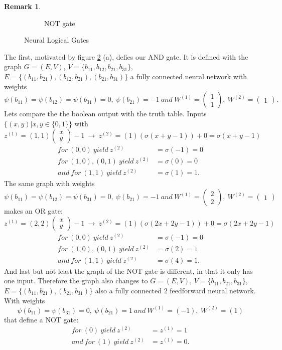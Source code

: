 \documentclass{article}
\theoremstyle{definition}
\newtheorem{remark}[theorem]{Remark}
\begin{document}
\begin{remark}
\begin{figure}[H]
\begin{subfigure}[b]{0.3\textwidth}
        \caption{NOT gate}
        \label{fig:NOT}
    \end{subfigure}
    \caption{Neural Logical Gates}\label{fig:neural_logic_gates}
\end{figure}
The first, motivated by figure \ref{fig:neural_logic_gates} (a), defies our AND gate. It is defined with the graph $G=(E, V)$, $V=\{ b_{11}, b_{12}, b_{21}, b_{31} \}$, $E=\{ (b_{11}, b_{21}), (b_{12}, b_{21}), (b_{21}, b_{31})\}$ a fully connected neural network with weights 
$$\psi(b_{11})=\psi(b_{12})=\psi(b_31)=0, \ \psi(b_{21})=-1 \ and \ W^{(1)}=\begin{pmatrix}1\\1\end{pmatrix}, \ W^{(2)}=\begin{pmatrix}1\end{pmatrix}.$$
Lets compare the the boolean output with the truth table. Inputs $\{(x, y)|x, y \in \{0, 1\}\}$ with
$$z^{(1)}=(1, 1)\begin{pmatrix}x\\y\end{pmatrix}-1 \ \to \ z^{(2)} = (1)(\sigma(x+y-1))+0 = \sigma(x+y-1)$$
\begin{align*}
for \ (0, 0) \ yield \ z^{(2)}&=\sigma(-1)=0 \\
for \ (1, 0), (0, 1) \ yield \ z^{(2)}&=\sigma(0)=0 \\
and \ for \ (1, 1) \ yield \ z^{(2)}&=\sigma(1)=1.
\end{align*}
The same graph with weights
$$\psi(b_{11})=\psi(b_{12})=\psi(b_31)=0, \ \psi(b_{21})=-1 \ and \ W^{(1)}=\begin{pmatrix}2\\2\end{pmatrix}, \ W^{(2)}=\begin{pmatrix}1\end{pmatrix}$$
makes an OR gate:
$$z^{(1)}=(2, 2)\begin{pmatrix}x\\y\end{pmatrix}-1 \ \to \ z^{(2)} = (1)(\sigma(2x+2y-1))+0 = \sigma(2x+2y-1)$$
\begin{align*}
for \ (0, 0) \ yield \ z^{(2)}&=\sigma(-1)=0 \\
for \ (1, 0), (0, 1) \ yield \ z^{(2)}&=\sigma(2)=1 \\
and \ for \ (1, 1) \ yield \ z^{(2)}&=\sigma(4)=1.
\end{align*}
And last but not least the graph of the NOT gate is different, in that it only has one input. Therefore the graph also changes to $G=(E, V)$, $V=\{ b_{11}, b_{21}, b_{31} \}$, $E=\{ (b_{11}, b_{21}), (b_{21}, b_{31})\}$ also a fully connected $2$ feedforward neural network. With weights
$$\psi(b_{11})=\psi(b_31)=0, \ \psi(b_{21})=1 \ and \ W^{(1)}=(-1), \ W^{(2)}=(1)$$
that define a NOT gate:
\begin{align*}
for \ (0) \ yield \ z^{(2)}&= z^{(1)} = 1 \\
and \ for \ (1) \ yield \ z^{(2)}&= z^{(1)} = 0.
\end{align*}


\end{remark}
\end{document}
